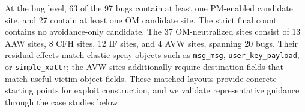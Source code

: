 At the bug level, 63 of the 97 bugs contain at least one PM-enabled candidate site, and 27 contain at least one OM candidate site. The strict final count contains no avoidance-only candidate. The 37 OM-neutralized sites consist of 13 AAW sites, 8 CFH sites, 12 IF sites, and 4 AVW sites, spanning 20 bugs. Their residual effects match elastic spray objects such as \texttt{msg\_msg}, \texttt{user\_key\_payload}, or \texttt{simple\_xattr}; the AVW sites additionally require destination fields that match useful victim-object fields. These matched layouts provide concrete starting points for exploit construction, and we validate representative guidance through the case studies below.







